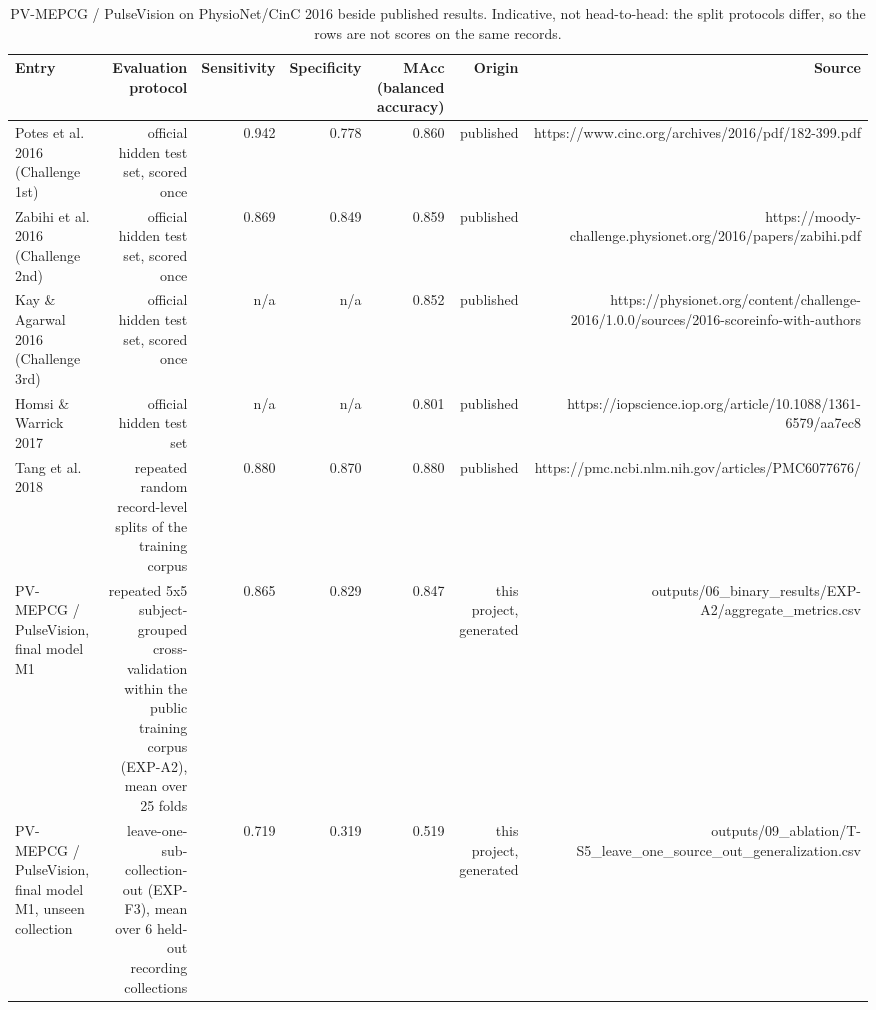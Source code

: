 \begin{table}[htbp]
  \centering
  \caption{PV-MEPCG / PulseVision on PhysioNet/CinC 2016 beside published results. Indicative, not head-to-head: the split protocols differ, so the rows are not scores on the same records.}
  \label{tab:lit-02}
  \begin{tabular}{lrrrrrr}
    \toprule
    Entry & Evaluation protocol & Sensitivity & Specificity & MAcc (balanced accuracy) & Origin & Source \\
    \midrule
    Potes et al. 2016 (Challenge 1st) & official hidden test set, scored once & 0.942 & 0.778 & 0.860 & published & https://www.cinc.org/archives/2016/pdf/182-399.pdf \\
    Zabihi et al. 2016 (Challenge 2nd) & official hidden test set, scored once & 0.869 & 0.849 & 0.859 & published & https://moody-challenge.physionet.org/2016/papers/zabihi.pdf \\
    Kay \& Agarwal 2016 (Challenge 3rd) & official hidden test set, scored once & n/a & n/a & 0.852 & published & https://physionet.org/content/challenge-2016/1.0.0/sources/2016-scoreinfo-with-authors \\
    Homsi \& Warrick 2017 & official hidden test set & n/a & n/a & 0.801 & published & https://iopscience.iop.org/article/10.1088/1361-6579/aa7ec8 \\
    Tang et al. 2018 & repeated random record-level splits of the training corpus & 0.880 & 0.870 & 0.880 & published & https://pmc.ncbi.nlm.nih.gov/articles/PMC6077676/ \\
    PV-MEPCG / PulseVision, final model M1 & repeated 5x5 subject-grouped cross-validation within the public training corpus (EXP-A2), mean over 25 folds & 0.865 & 0.829 & 0.847 & this project, generated & outputs/06\_binary\_results/EXP-A2/aggregate\_metrics.csv \\
    PV-MEPCG / PulseVision, final model M1, unseen collection & leave-one-sub-collection-out (EXP-F3), mean over 6 held-out recording collections & 0.719 & 0.319 & 0.519 & this project, generated & outputs/09\_ablation/T-S5\_leave\_one\_source\_out\_generalization.csv \\

\end{tabular}
\end{table}
